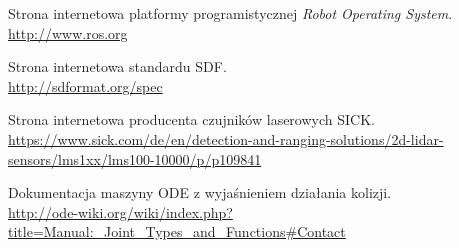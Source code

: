 \begin{thebibliography}{0}
Strona internetowa platformy programistycznej \emph{Robot Operating System}. \\
\url{http://www.ros.org}

Strona internetowa standardu SDF. \\
\url{http://sdformat.org/spec}

Strona internetowa producenta czujników laserowych SICK. \\
\url{https://www.sick.com/de/en/detection-and-ranging-solutions/2d-lidar-sensors/lms1xx/lms100-10000/p/p109841}

Dokumentacja maszyny ODE z wyjaśnieniem działania kolizji. \\
\url{http://ode-wiki.org/wiki/index.php?title=Manual:_Joint_Types_and_Functions#Contact}

\end{thebibliography}

